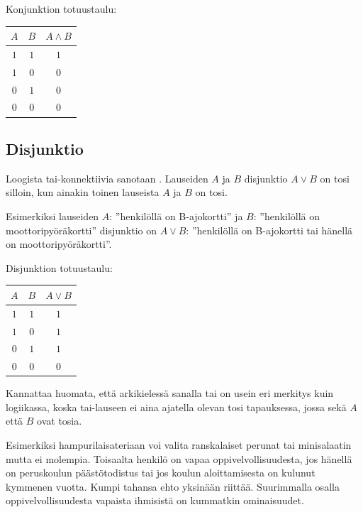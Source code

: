 Konjunktion totuustaulu:

\bigskip

\begin{center}
\begin{tabular}{|c|c|c|}\hline
$A$ & $B$ & $A\land B$ \\ \hline
$1$ & $1$ & $1$\\ 
$1$ & $0$ & $0$\\
$0$ & $1$ & $0$\\
$0$ & $0$ & $0$\\
\hline
\end{tabular}
\end{center}

\bigskip

\subsection*{Disjunktio} Loogista tai-konnektiivia sanotaan . Lauseiden $A$ ja $B$ disjunktio $A\lor B$ on tosi silloin, kun ainakin toinen lauseista $A$ ja $B$ on tosi.


Esimerkiksi lauseiden $A$: ''henkilöllä on B-ajokortti'' ja $B$: ''henkilöllä on moottoripyöräkortti'' disjunktio on $A \lor B$: ''henkilöllä on B-ajokortti tai hänellä on moottoripyöräkortti''. 

Disjunktion totuustaulu:
 
\bigskip

\begin{center}
\begin{tabular}{|c|c|c|}\hline
$A$ & $B$ & $A\lor B$ \\ \hline
$1$ & $1$ & $1$\\ 
$1$ & $0$ & $1$\\
$0$ & $1$ & $1$\\
$0$ & $0$ & $0$\\ \hline
\end{tabular}
\end{center}

\bigskip

Kannattaa huomata, että arkikielessä sanalla tai on usein eri merkitys kuin logiikassa, koska tai-lauseen ei aina ajatella olevan tosi tapauksessa, jossa sekä $A$ että $B$ ovat tosia.

Esimerkiksi hampurilaisateriaan voi valita ranskalaiset perunat tai minisalaatin mutta ei molempia. Toisaalta henkilö on vapaa oppivelvollisuudesta, jos hänellä on peruskoulun päästötodistus tai jos koulun aloittamisesta on kulunut kymmenen vuotta. Kumpi tahansa ehto yksinään riittää. Suurimmalla osalla oppivelvollisuudesta vapaista ihmisistä on kummatkin ominaisuudet.

